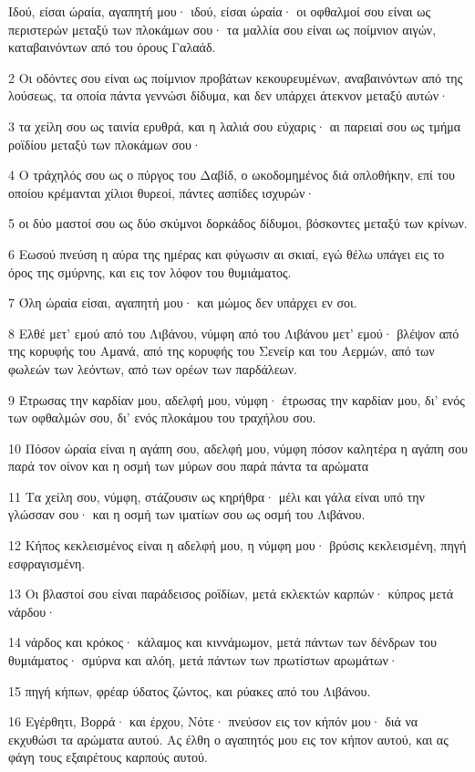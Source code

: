 \par Ιδού, είσαι ώραία, αγαπητή μου· ιδού, είσαι ώραία· οι οφθαλμοί σου είναι ως περιστερών μεταξύ των πλοκάμων σου· τα μαλλία σου είναι ως ποίμνιον αιγών, καταβαινόντων από του όρους Γαλαάδ.
\par 2 Οι οδόντες σου είναι ως ποίμνιον προβάτων κεκουρευμένων, αναβαινόντων από της λούσεως, τα οποία πάντα γεννώσι δίδυμα, και δεν υπάρχει άτεκνον μεταξύ αυτών·
\par 3 τα χείλη σου ως ταινία ερυθρά, και η λαλιά σου εύχαρις· αι παρειαί σου ως τμήμα ροϊδίου μεταξύ των πλοκάμων σου·
\par 4 Ο τράχηλός σου ως ο πύργος του Δαβίδ, ο ωκοδομημένος διά οπλοθήκην, επί του οποίου κρέμανται χίλιοι θυρεοί, πάντες ασπίδες ισχυρών·
\par 5 οι δύο μαστοί σου ως δύο σκύμνοι δορκάδος δίδυμοι, βόσκοντες μεταξύ των κρίνων.
\par 6 Εωσού πνεύση η αύρα της ημέρας και φύγωσιν αι σκιαί, εγώ θέλω υπάγει εις το όρος της σμύρνης, και εις τον λόφον του θυμιάματος.
\par 7 Όλη ώραία είσαι, αγαπητή μου· και μώμος δεν υπάρχει εν σοι.
\par 8 Ελθέ μετ' εμού από του Λιβάνου, νύμφη από του Λιβάνου μετ' εμού· βλέψον από της κορυφής του Αμανά, από της κορυφής του Σενείρ και του Αερμών, από των φωλεών των λεόντων, από των ορέων των παρδάλεων.
\par 9 Έτρωσας την καρδίαν μου, αδελφή μου, νύμφη· έτρωσας την καρδίαν μου, δι' ενός των οφθαλμών σου, δι' ενός πλοκάμου του τραχήλου σου.
\par 10 Πόσον ώραία είναι η αγάπη σου, αδελφή μου, νύμφη πόσον καλητέρα η αγάπη σου παρά τον οίνον και η οσμή των μύρων σου παρά πάντα τα αρώματα
\par 11 Τα χείλη σου, νύμφη, στάζουσιν ως κηρήθρα· μέλι και γάλα είναι υπό την γλώσσαν σου· και η οσμή των ιματίων σου ως οσμή του Λιβάνου.
\par 12 Κήπος κεκλεισμένος είναι η αδελφή μου, η νύμφη μου· βρύσις κεκλεισμένη, πηγή εσφραγισμένη.
\par 13 Οι βλαστοί σου είναι παράδεισος ροϊδίων, μετά εκλεκτών καρπών· κύπρος μετά νάρδου·
\par 14 νάρδος και κρόκος· κάλαμος και κιννάμωμον, μετά πάντων των δένδρων του θυμιάματος· σμύρνα και αλόη, μετά πάντων των πρωτίστων αρωμάτων·
\par 15 πηγή κήπων, φρέαρ ύδατος ζώντος, και ρύακες από του Λιβάνου.
\par 16 Εγέρθητι, Βορρά· και έρχου, Νότε· πνεύσον εις τον κήπόν μου· διά να εκχυθώσι τα αρώματα αυτού. Ας έλθη ο αγαπητός μου εις τον κήπον αυτού, και ας φάγη τους εξαιρέτους καρπούς αυτού.

